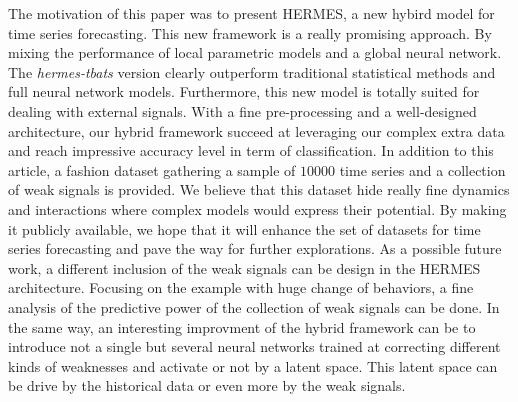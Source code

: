 \documentclass{article} %
\newcommand{\numberts}{10000}
\begin{document}

The motivation of this paper was to present HERMES, a new hybird model for time series forecasting. This new framework is a really promising approach. By mixing the performance of local parametric models and a global neural network. The \textit{hermes-tbats} version clearly outperform traditional statistical methods and full neural network models. Furthermore, this new model is totally suited for dealing with external signals. With a fine pre-processing and a well-designed architecture, our hybrid framework succeed at leveraging our complex extra data and reach impressive accuracy level in term of classification. In addition to this article, a fashion dataset gathering a sample of $\numberts$ time series and a collection of weak signals is provided. We believe that this dataset hide really fine dynamics and interactions where complex models would express their potential. By making it publicly available, we hope that it will enhance the set of datasets for time series forecasting and pave the way for further explorations.
As a possible future work, a different inclusion of the weak signals can be design in the HERMES architecture. Focusing on the example with huge change of behaviors, a fine analysis of the predictive power of the collection of weak signals can be done. In the same way, an interesting improvment of the hybrid framework can be to introduce not a single but several neural networks trained at correcting different kinds of weaknesses and activate or not by a latent space. This latent space can be drive by the historical data or even more by the weak signals.




\end{document}
